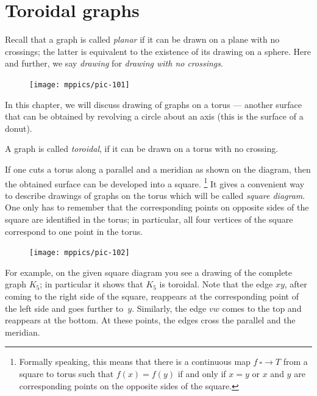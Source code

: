 \chapter{Toroidal graphs}

Recall that a graph is called \emph{planar} if it can be drawn on a plane with no crossings;
the latter is equivalent to the existence of its drawing on a sphere.
Here and further, we say \emph{drawing} for \textit{drawing with no crossings}.  

\begin{figure}
\vskip-2mm
\centering
\texttt{[image: mppics/pic-101]}
\end{figure}

In this chapter, we will discuss drawing of graphs on a torus --- another surface that can be obtained by revolving a circle about an axis (this is the surface of a donut).

A graph is called \emph{toroidal}, if it can be drawn on a torus with no crossing.

If one cuts a torus along a parallel and a meridian as shown on the diagram,
then the obtained surface can be developed into a square.%
\footnote{Formally speaking, this means that there is a continuous map $f\:\square\to T$ from a square to torus  such that $f(x)=f(y)$ if and only if $x=y$ or $x$ and $y$ are corresponding points on the opposite sides of the square.}
It gives a convenient way to describe drawings of graphs on the torus which will be called \emph{square diagram}.
One only has to remember that the corresponding points on opposite sides of the square are identified in the torus;
in particular, all four vertices of the square correspond to one point in the torus.

{

\begin{figure}
\vskip-4mm
\centering
\texttt{[image: mppics/pic-102]}
\end{figure}

For example, on the given square diagram you see a drawing of the  complete graph $K_5$;
in particular it shows that $K_5$ is toroidal.
Note that the edge $xy$,
after coming to the right side of the square, reappears at the corresponding point of the left side and goes further to~$y$.
Similarly, the edge $vw$ comes to the top and reappears at the bottom.
At these points, the edges cross the parallel and the meridian.

}

